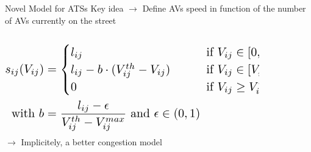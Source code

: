 \begin{frame}{Novel Model for ATSs}
	Key idea $\rightarrow$ Define AVs speed in function of the number of AVs currently on the street
	\begin{columns}
		\begin{column}{0.4\textwidth}
			\begin{equation*}
				\resizebox{1.3\textwidth}{!}{$
				\begin{aligned}	
					s_{ij}(V_{ij}) &= \begin{cases}
						l_{ij} \quad\quad &\text{if } V_{ij}\in[0,V_{ij}^{th})\\ 
						l_{ij} - b\cdot(V_{ij}^{th}- V_{ij}) \quad\quad &\text{if }V_{ij}\in[V_{ij}^{th}, V_{ij}^{max})\\ 
						0\quad\quad &\text{if }V_{ij} \ge V_{ij}^{max}\\ 
					\end{cases}\\
					\text{with } b  &=  \dfrac{l_{ij}-\epsilon }{ V_{ij}^{th} -  V_{ij}^{max}} \text{ and } \epsilon \in (0,1)
				\end{aligned}
				$}
			\end{equation*}
			$\rightarrow$ Implicitely, a better congestion model
		\end{column}
		\begin{column}{0.4\textwidth}
			\begin{figure}[t]
				\centering
			\end{figure}
		\end{column}
	\end{columns}
\end{frame}

